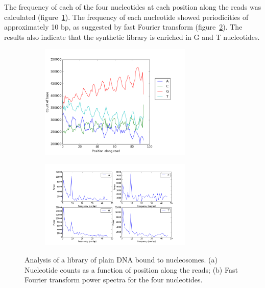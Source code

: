 \documentclass[a4paper, numbers=noenddot]{scrbook}
\begin{document}
The frequency of each of the four nucleotides at each position along the reads was calculated (figure~\ref{fig:enriched_counts}). The frequency of each nucleotide showed periodicities of approximately 10 bp, as suggested by fast Fourier transform (figure~\ref{fig:enriched_power}).  The results also indicate that the synthetic library is enriched in G and T nucleotides.

\begin{figure}[htbp]
  \centering
  \begin{subfigure}[htbp]{0.8\textwidth}
    \centering
    \includegraphics[width=0.8\textwidth]{enriched-counts}
    \caption{}
    \label{fig:enriched_counts}
  \end{subfigure}
  \begin{subfigure}[htbp]{0.8\textwidth}
    \centering
    \includegraphics[width=0.8\textwidth]{enriched-power}
    \caption{}
    \label{fig:enriched_power}
  \end{subfigure}
  \caption{Analysis of a library of plain DNA bound to nucleosomes. (a) Nucleotide counts as a function of position along the reads; (b) Fast Fourier transform power spectra for the four nucleotides.}
  \label{fig:enriched}
\end{figure}
\end{document}
